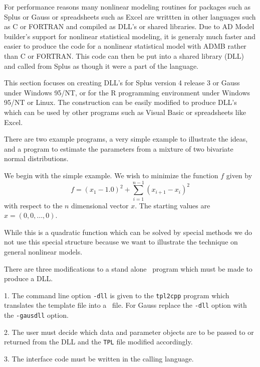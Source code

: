 
For performance reasons many nonlinear modeling routines for packages
such as Splus or Gauss or spreadsheets such as Excel
are writtten in other languages such as C or FORTRAN and
compiled as DLL's or shared libraries. Due to 
AD Model builder's support for nonlinear statistical modeling, it
is generaly much faster and easier to produce the code for
a nonlinear statistical model with ADMB rather than C or FORTRAN.
This code can then be put into a shared library (DLL) and called
from Splus as though it were a part of the language. 

This section focuses on creating DLL's for Splus version 4 release 3 or Gauss
under
Windows 95/NT,
or for the R programming environment under Windows 95/NT or Linux. 
The construction can be easily modified to produce DLL's which can be
used by other programs such as Visual Basic or spreadsheets like Excel.

There are two example programs, a very 
simple example to illustrate the ideas,
and a program to estimate the parameters from a mixture of two bivariate
normal distributions.
 
We begin with the simple example. We
wish to minimize the function $f$ given by
$$ f=(x_1-1.0)^2+\sum_{i=1}^{n-1}(x_{i+1}-x_i)^2$$
with respect to the $n$ dimensional vector $x$. The
starting values are $x=(0,0,\ldots,0)$.
   
While this is a quadratic function which can be solved by special methods
we do not use this special structure because we want to illustrate
the technique on general nonlinear models. 

There are three modifications to a stand alone \ADM\ program
which must be made to produce a DLL.

\begin{description}
\item{1.} The command line option {\tt -dll} is given to the
{\tt tpl2cpp} program which translates the template file into a
\cplus\ file. For Gauss replace the {\tt -dll} option with
the {\tt -gausdll} option.

\item{2.} The user must decide which data and parameter
objects are to be passed to or returned from the DLL
and the {\tt TPL} file modified accordingly.

\item{3.} The interface code must be written in the
calling language. 
\end{description}

